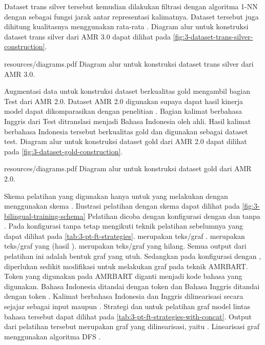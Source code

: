 Dataset trans silver tersebut kemudian dilakukan filtrasi dengan algoritma 1-NN dengan \cossim{} sebagai fungsi jarak antar representasi kalimatnya.
Dataset tersebut juga dihitung kualitasnya menggunakan rata-rata \cossim{}.
Diagram alur untuk konstruksi dataset trans silver dari AMR 3.0 dapat dilihat pada \cref{fig:3-dataset-trans-silver-construction}.

  {resources/diagrams.pdf}
  {Diagram alur untuk konstruksi dataset trans silver dari AMR 3.0.}

Augmentasi data untuk konstruksi dataset berkualitas gold mengambil bagian Test  dari AMR 2.0.
Dataset AMR 2.0 digunakan supaya dapat hasil kinerja model dapat dikomparasikan dengan penelitian \textcite{putra2022}.
Bagian kalimat berbahasa Inggris dari Test  ditranslasi menjadi Bahasa Indonesia oleh ahli.
Hasil kalimat berbahasa Indonesia tersebut berkualitas gold dan digunakan sebagai dataset test.
Diagram alur untuk konstruksi dataset gold dari AMR 2.0 dapat dilihat pada \cref{fig:3-dataset-gold-construction}.

  {resources/diagrams.pdf}
  {Diagram alur untuk konstruksi dataset gold dari AMR 2.0.}

\newcommand\graphMasked{\codesm{\textcolor[rgb]{0,.33,0}{<g>$g_1$,..[mask]..,$g_m$</g>}}}
\newcommand\graphBarMasked{\codesm{\textcolor[rgb]{0,.33,0}{<g>[mask]</g>}}}
\newcommand\idTagged[1]{\codesm{\textcolor{purple}{<id>#1</id>}}}
\newcommand\enTagged[1]{\codesm{\textcolor{blue}{<en>#1</en>}}}
\newcommand\sTagged[1]{\codesm{\textcolor{purple}{<s>#1</s>}}}

Skema pelatihan yang digunakan hanya untuk yang melakukan \amrparsing{} dengan menggunakan skema .
Ilustrasi pelatihan dengan skema  dapat dilihat pada \cref{fig:3-bilingual-training-schema}
Pelatihan dicoba dengan konfigurasi dengan dan tanpa .
Pada konfigurasi tanpa  tetap mengikuti teknik pelatihan sebelumnya yang dapat dilihat pada \cref{tab:3-pt-ft-strategies}.
 merupakan teks/graf .
 merupakan teks/graf yang  (hasil \denoising{}).
 merupakan teks/graf yang hilang.
Semua output dari pelatihan ini adalah bentuk graf yang utuh.
Sedangkan pada konfigurasi dengan , diperlukan sedikit modifikasi untuk melakukan \pretraining{} graf pada teknik \gls{AMRBART}.
Token  yang digunakan pada \gls{AMRBART} diganti menjadi kode bahasa yang digunakan.
Bahasa Indonesia ditandai dengan token  dan Bahasa Inggris ditandai dengan token .
Kalimat berbahasa Indonesia dan Inggris dilinearisasi secara sejajar sebagai input \pretraining{} maupun \finetuning{}.
Strategi \pretraining{} dan \finetuning{} untuk pelatihan graf model \amrparsing{} lintas bahasa tersebut dapat dilihat pada \cref{tab:3-pt-ft-strategies-with-concat}.
Output dari pelatihan tersebut merupakan graf \AMR{} yang dilinearisasi, yaitu .
Linearisasi graf menggunakan algoritma \gls{DFS} .


